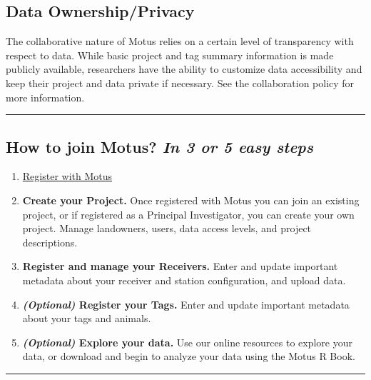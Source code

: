 \documentclass[
]{article}
\providecommand{\tightlist}{%
  \setlength{\itemsep}{0pt}\setlength{\parskip}{0pt}}
\begin{document}
\hypertarget{data-ownershipprivacy}{%
\subsection{Data Ownership/Privacy}\label{data-ownershipprivacy}}

The collaborative nature of Motus relies on a certain level of
transparency with respect to data. While basic project and tag summary
information is made publicly available, researchers have the ability to
customize data accessibility and keep their project and data private if
necessary. See the collaboration policy for more information.

\begin{center}\rule{0.5\linewidth}{0.5pt}\end{center}

\hypertarget{how-to-join-motus-in-3-or-5-easy-steps}{%
\subsection{\texorpdfstring{How to join Motus? \emph{In 3 or 5 easy
steps}}{How to join Motus? In 3 or 5 easy steps}}\label{how-to-join-motus-in-3-or-5-easy-steps}}

\begin{enumerate}
\def\labelenumi{\arabic{enumi}.}
\tightlist
\item
  \href{https://motus.org/data/user/new}{Register with Motus}
\item
  \textbf{Create your Project.} Once registered with Motus you can join
  an existing project, or if registered as a Principal Investigator, you
  can create your own project. Manage landowners, users, data access
  levels, and project descriptions.
\item
  \textbf{Register and manage your Receivers.} Enter and update
  important metadata about your receiver and station configuration, and
  upload data.
\item
  \textbf{\emph{(Optional)} Register your Tags.} Enter and update
  important metadata about your tags and animals.
\item
  \textbf{\emph{(Optional)} Explore your data.} Use our online resources
  to explore your data, or download and begin to analyze your data using
  the Motus R Book.
\end{enumerate}

\begin{center}\rule{0.5\linewidth}{0.5pt}\end{center}
\end{document}
